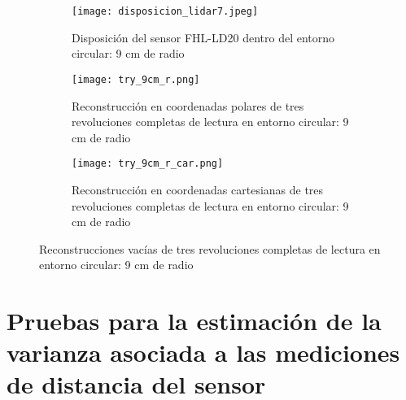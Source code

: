 \begin{figure}[H]
	\centering
	\begin{subfigure}{0.6\textwidth}
		\centering
		\texttt{[image: disposicion\_lidar7.jpeg]}
		\caption{Disposición del sensor FHL-LD20 dentro del entorno circular: 9 cm de radio}
		\label{disposicion_lidar6}
		\vspace{1em}
	\end{subfigure}
	\begin{subfigure}{0.45\textwidth}
		\centering
		\texttt{[image: try\_9cm\_r.png]}
		\caption{Reconstrucción en coordenadas polares de tres revoluciones completas de lectura en entorno circular: 9 cm de radio}
		\label{try_9cm_r}
	\end{subfigure}
	\hspace{1em}
	\begin{subfigure}{0.45\textwidth}
		\centering
		\texttt{[image: try\_9cm\_r\_car.png]}
		\caption{Reconstrucción en coordenadas cartesianas de tres revoluciones completas de lectura en entorno circular: 9 cm de radio}
		\label{try_9cm_r_car}
	\end{subfigure}
	\caption{Reconstrucciones vacías de tres revoluciones completas de lectura en entorno circular: 9 cm de radio}
	\label{fig: reconstrucciones_vacías_9}
\end{figure}

\section{Pruebas para la estimación de la varianza asociada a las mediciones de distancia del sensor}
